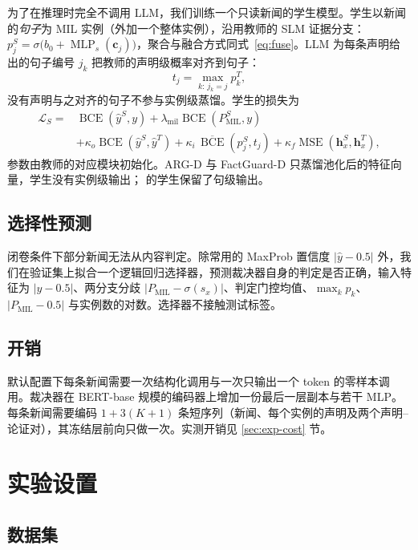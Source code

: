 为了在推理时完全不调用 LLM，我们训练一个只读新闻的学生模型。学生以新闻的\emph{句子}为 MIL 实例（外加一个整体实例），沿用教师的 SLM 证据分支：$p_j^S=\sigma\big(b_0+\operatorname{MLP}_s(\bm c_j)\big)$，聚合与融合方式同式~\eqref{eq:fuse}。LLM 为每条声明给出的句子编号 $j_k$ 把教师的声明级概率对齐到句子：
\begin{equation}
t_j=\max_{k:\,j_k=j}p_k^{T},
\end{equation}
没有声明与之对齐的句子不参与实例级蒸馏。学生的损失为
\begin{equation}
\begin{aligned}
\mathcal L_S={}&\operatorname{BCE}(\hat y^S,y)+\lambda_{\mathrm{mil}}\operatorname{BCE}(P^S_{\mathrm{MIL}},y)\\
&+\kappa_{o}\operatorname{BCE}(\hat y^S,\hat y^T)+\kappa_{i}\,\overline{\operatorname{BCE}}(p^S_j,t_j)+\kappa_{f}\operatorname{MSE}(\bm h^S_x,\bm h^T_x),
\end{aligned}
\end{equation}
参数由教师的对应模块初始化。ARG-D 与 FactGuard-D 只蒸馏池化后的特征向量，学生没有实例级输出；\student{} 的学生保留了句级输出。

\subsection{选择性预测}\label{sec:selective}

闭卷条件下部分新闻无法从内容判定。除常用的 MaxProb 置信度 $|\hat y-0.5|$ 外，我们在验证集上拟合一个逻辑回归选择器，预测裁决器自身的判定是否正确，输入特征为 $|\hat y-0.5|$、两分支分歧 $|P_{\mathrm{MIL}}-\sigma(s_x)|$、判定门控均值、$\max_k p_k$、$|P_{\mathrm{MIL}}-0.5|$ 与实例数的对数。选择器不接触测试标签。

\subsection{开销}\label{sec:cost}

默认配置下每条新闻需要一次结构化调用与一次只输出一个 token 的零样本调用。裁决器在 BERT-base 规模的编码器上增加一份最后一层副本与若干 MLP。每条新闻需要编码 $1+3(K{+}1)$ 条短序列（新闻、每个实例的声明及两个声明--论证对），其冻结层前向只做一次。实测开销见 \ref{sec:exp-cost} 节。

\section{实验设置}\label{sec:setup}

\subsection{数据集}

